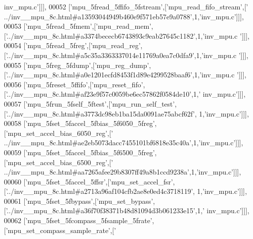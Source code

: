 \begin{DoxyCode}
{      inv\_mpu.c'}]]],
00052   [\textcolor{stringliteral}{'mpu\_5fread\_5ffifo\_5fstream'},[\textcolor{stringliteral}{'mpu\_read\_fifo\_stream'},[\textcolor{stringliteral}{'
      ../inv\_\_mpu\_8c.html#a13593044949b460e9f571eb57e9a0788'},1,\textcolor{stringliteral}{'inv\_mpu.c'}]]],
00053   [\textcolor{stringliteral}{'mpu\_5fread\_5fmem'},[\textcolor{stringliteral}{'mpu\_read\_mem'},[\textcolor{stringliteral}{'../inv\_\_mpu\_8c.html#a3374bececb6743893c9eab27645c1182'},1,\textcolor{stringliteral}{'inv\_mpu.c
      '}]]],
00054   [\textcolor{stringliteral}{'mpu\_5fread\_5freg'},[\textcolor{stringliteral}{'mpu\_read\_reg'},[\textcolor{stringliteral}{'../inv\_\_mpu\_8c.html#a5c35a3363337014e11769a0ea7c0dfa9'},1,\textcolor{stringliteral}{'inv\_mpu.c
      '}]]],
00055   [\textcolor{stringliteral}{'mpu\_5freg\_5fdump'},[\textcolor{stringliteral}{'mpu\_reg\_dump'},[\textcolor{stringliteral}{'../inv\_\_mpu\_8c.html#a0e1201ecfd8453f1d89e4299528baaf6'},1,\textcolor{stringliteral}{'inv\_mpu.c
      '}]]],
00056   [\textcolor{stringliteral}{'mpu\_5freset\_5ffifo'},[\textcolor{stringliteral}{'mpu\_reset\_fifo'},[\textcolor{stringliteral}{'../inv\_\_mpu\_8c.html#af23e9f57c0059be6ec57862f0584de10'},1,\textcolor{stringliteral}{'
      inv\_mpu.c'}]]],
00057   [\textcolor{stringliteral}{'mpu\_5frun\_5fself\_5ftest'},[\textcolor{stringliteral}{'mpu\_run\_self\_test'},[\textcolor{stringliteral}{'../inv\_\_mpu\_8c.html#a3773dc98eb1ba15da0091ae75abcf62f'},
      1,\textcolor{stringliteral}{'inv\_mpu.c'}]]],
00058   [\textcolor{stringliteral}{'mpu\_5fset\_5faccel\_5fbias\_5f6050\_5freg'},[\textcolor{stringliteral}{'mpu\_set\_accel\_bias\_6050\_reg'},[\textcolor{stringliteral}{'
      ../inv\_\_mpu\_8c.html#ae2eb5073dacc7455101bf6818e35c40a'},1,\textcolor{stringliteral}{'inv\_mpu.c'}]]],
00059   [\textcolor{stringliteral}{'mpu\_5fset\_5faccel\_5fbias\_5f6500\_5freg'},[\textcolor{stringliteral}{'mpu\_set\_accel\_bias\_6500\_reg'},[\textcolor{stringliteral}{'
      ../inv\_\_mpu\_8c.html#aa7265afee29b8307ff49a8b1ccd9238a'},1,\textcolor{stringliteral}{'inv\_mpu.c'}]]],
00060   [\textcolor{stringliteral}{'mpu\_5fset\_5faccel\_5ffsr'},[\textcolor{stringliteral}{'mpu\_set\_accel\_fsr'},[\textcolor{stringliteral}{'../inv\_\_mpu\_8c.html#a2713a96af104cfb2ae8e0ed4c3718119'},
      1,\textcolor{stringliteral}{'inv\_mpu.c'}]]],
00061   [\textcolor{stringliteral}{'mpu\_5fset\_5fbypass'},[\textcolor{stringliteral}{'mpu\_set\_bypass'},[\textcolor{stringliteral}{'../inv\_\_mpu\_8c.html#a36f70f38371b48d81094d3b061233e15'},1,\textcolor{stringliteral}{'
      inv\_mpu.c'}]]],
00062   [\textcolor{stringliteral}{'mpu\_5fset\_5fcompass\_5fsample\_5frate'},[\textcolor{stringliteral}{'mpu\_set\_compass\_sample\_rate'},[\textcolor{stringliteral}{'
}
\end{DoxyCode}

